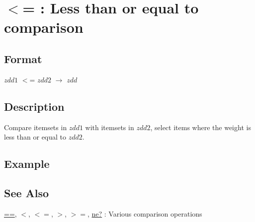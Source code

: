 
\section{$<$= : Less than or equal to comparison\label{sect:le}}
\subsection*{Format}
$zdd1$ $<$= $zdd2$ $\rightarrow$ $zdd$

\subsection*{Description}
Compare itemsets in $zdd1$ with itemsets in $zdd2$, select items where the weight is less than or equal to $zdd2$. 


\subsection*{Example}


\subsection*{See Also}
\hyperref[sect:eq]{==},
\hyperref[sect:lt]{$<$},
\hyperref[sect:le]{$<=$},
\hyperref[sect:gt]{$>$},
\hyperref[sect:ge]{$>=$},
\hyperref[sect:ne]{ne?} : Various comparison operations 


